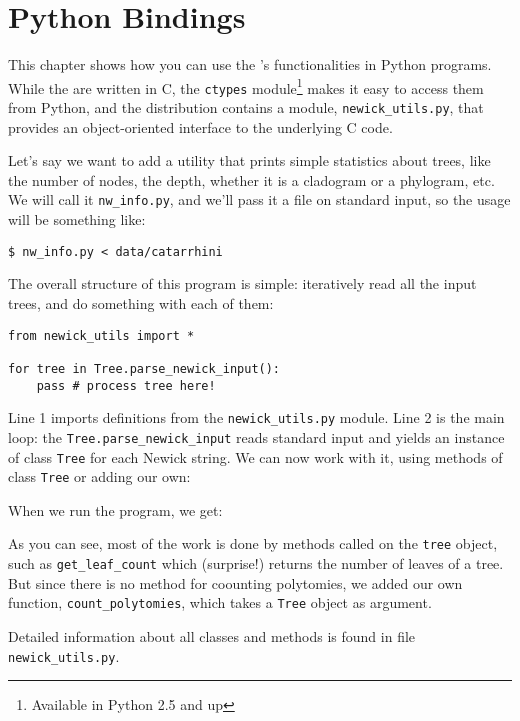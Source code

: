
\chapter{Python Bindings}
\label{chap_python_lib}

This chapter shows how you can use the \nutils{}'s functionalities in Python
programs. While the \nutils{} are written in C, the \texttt{ctypes}
module\footnote{Available in Python 2.5 and up} makes it easy to access them
from Python, and the distribution contains a module, \texttt{newick\_utils.py},
that provides an object-oriented interface to the underlying C code.

Let's say we want to add a utility that prints simple statistics about trees,
like the number of nodes, the depth, whether it is a cladogram or a phylogram,
etc. We will call it \texttt{nw\_info.py}, and we'll pass it a \nw{}
file on standard input, so the usage will be something like:

\begin{verbatim}
$ nw_info.py < data/catarrhini
\end{verbatim}

\noindent{}The overall structure of this program is simple: iteratively read
all the input trees, and do something with each of them:

\begin{lstlisting}
from newick_utils import *

for tree in Tree.parse_newick_input():
    pass # process tree here!
\end{lstlisting}

\noindent{}Line 1 imports definitions from the \texttt{newick\_utils.py}
module. Line 2 is the main loop: the \texttt{Tree.parse\_newick\_input}
reads standard input and yields an instance of class \texttt{Tree} for each
Newick string. We can now work with it, using methods of class \texttt{Tree} or adding our own:



\noindent{}When we run the program, we get:




As you can see, most of the work is done by methods called on the \texttt{tree}
object, such as \texttt{get\_leaf\_count} which (surprise!) returns the number
of leaves of a tree. But since there is no method for coounting polytomies, we
added our own function, \texttt{count\_polytomies}, which takes a \texttt{Tree}
object as argument.

Detailed information about all classes and methods is found in file
\texttt{newick\_utils.py}.

